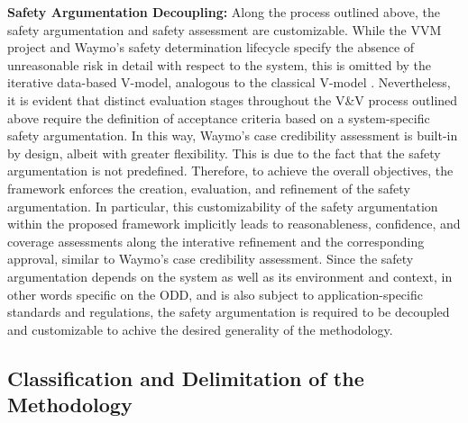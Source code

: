 \textbf{Safety Argumentation Decoupling:} Along the process outlined above, the safety argumentation and safety assessment are customizable. While the VVM project \cite{VVMOverall} and Waymo's safety determination lifecycle \cite{favaro2023building} specify the absence of unreasonable risk in detail with respect to the system, this is omitted by the iterative data-based V-model, analogous to the classical V-model \cite{brohl1993v}. Nevertheless, it is evident that distinct evaluation stages throughout the V\&V process outlined above require the definition of acceptance criteria based on a system-specific safety argumentation. In this way, Waymo's case credibility assessment \cite{favaro2023building} is built-in by design, albeit with greater flexibility. This is due to the fact that the safety argumentation is not predefined. Therefore, to achieve the overall objectives, the framework enforces the creation, evaluation, and refinement of the safety argumentation. In particular, this customizability of the safety argumentation within the proposed framework implicitly leads to reasonableness, confidence, and coverage assessments along the interative refinement and the corresponding approval, similar to Waymo's case credibility assessment. Since the safety argumentation depends on the system as well as its environment and context, in other words specific on the ODD, and is also subject to application-specific standards and regulations, the safety argumentation is required to be decoupled and customizable to achive the desired generality of the methodology.


\subsection{Classification and Delimitation of the Methodology}\label{sec:classi}

